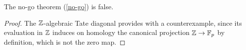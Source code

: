 \begin{lemma}
	The no-go theorem (\cref{no-go}) is false.
\end{lemma}

\begin{proof}
	The \(\mathbb{Z}\)-algebraic Tate diagonal provides with a counterexample, since its evaluation in \(\mathbb{Z}\) induces on homology the canonical projection \(\mathbb{Z} \to {\mathbb{F}_p}\) by definition, which is not the zero map.
\end{proof}






